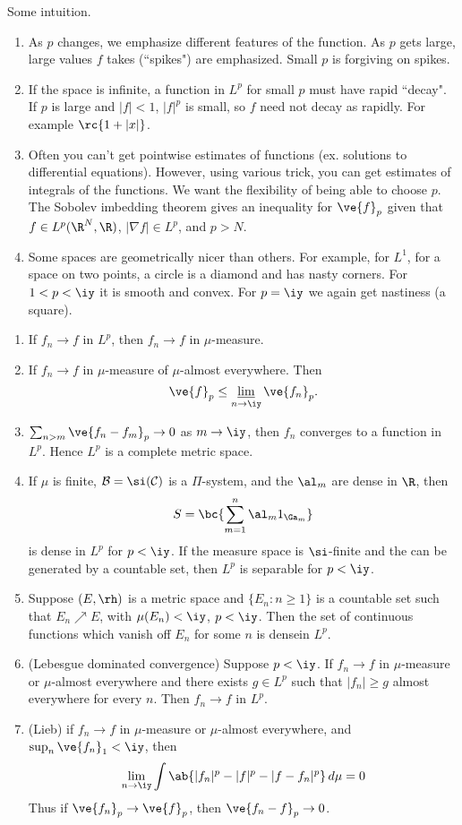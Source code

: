 Some intuition.
\begin{enumerate}
\item As $p$ changes, we emphasize different features of the function. As $p$ gets large, large values $f$ takes (``spikes") are emphasized. Small $p$ is forgiving on spikes.
\item 
If the space is infinite, a function in $L^p$ for small $p$ must have rapid ``decay". 
If $p$ is large and $|f|<1$, $|f|^p$ is small, so $f$ need not decay as rapidly. For example $\rc{1+|x|}$.
\item 
Often you can't get pointwise estimates of functions (ex. solutions to differential equations). However, using various trick, you can get estimates of integrals of the functions. We want the flexibility of being able to choose $p$. 
The Sobolev imbedding theorem gives an inequality for $\ve{f}_p$ given that
$f\in L^p(\R^N, \R)$, $|\nabla f|\in L^p$, and $p>N$.
\item
Some spaces are geometrically nicer than others. For example, for $L^1$, for a space on two points, a circle is a diamond and has nasty corners. For $1<p<\iy$ it is smooth and convex. For $p=\iy$ we again get nastiness (a square).
\end{enumerate}
\begin{thm}\label{lpbasic}
\begin{enumerate}
\item
If $f_n\to f$ in $L^p$, then $f_n\to f$ in $\mu$-measure.
\item %
If $f_n\to f$ in $\mu$-measure of $\mu$-almost everywhere. Then 
\[
\ve{f}_p\le \varliminf_{n\to \iy} \ve{f_n}_p.
\]
\item $\sum_{n>m} \ve{f_n-f_m}_p\to 0$ as $m\to \iy$, then $f_n$ converges to a function in $L^p$. Hence $L^p$ is a complete metric space.
\item If $\mu$ is finite, $\cal B=\si(\cal C)$ is a $\Pi$-system, and the $\al_m$ are dense in $\R$, then 
\[
S=\bc{\sum_{m=1}^n \al_m1_{\Ga_m}}
\]
is dense in $L^p$ for $p<\iy$. If the measure space is $\si$-finite and the \sia{} can be generated by a countable set, then $L^p$ is separable for $p<\iy$.
\item Suppose $(E,\rh)$ is a metric space and $\{E_n:n\ge 1\}$ is a countable set such that $E_n\nearrow E$, with $\mu(E_n)<\iy$, $p<\iy$. Then the set of continuous functions which vanish off $E_n$ for some $n$ is densein $L^p$.
\item (Lebesgue dominated convergence) Suppose $p<\iy$. If $f_n\to f$ in $\mu$-measure or $\mu$-almost everywhere and there exists $g\in L^p$ such that $|f_n|\ge g$ almost everywhere for every $n$. Then $f_n\to f$ in $L^p$.
\item (Lieb) if $f_n\to f$ in $\mu$-measure or $\mu$-almost everywhere, and $\sup_n \ve{f_n}_1<\iy$, then 
\[
\lim_{n\to \iy} \int \ab{|f_n|^p-|f|^p-|f-f_n|^p}\,d\mu=0
\]
Thus if $\ve{f_n}_{p}\to \ve{f}_{p}$, then $\ve{f_n-f}_p\to 0$. 
\end{enumerate}
\end{thm}
